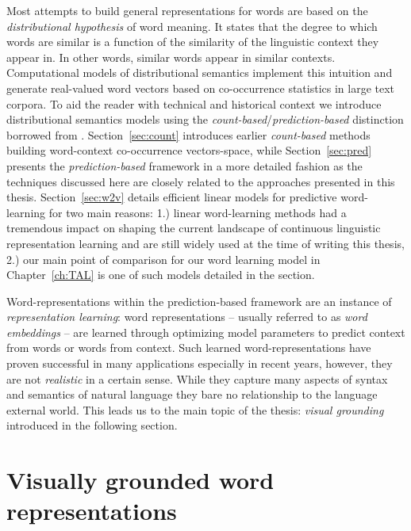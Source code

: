 Most attempts to build  general representations for words are based on the
\emph{distributional hypothesis} of word meaning. It states that the degree to which words are similar
is a function of the similarity of the linguistic context they appear in. In other words, similar
words appear in similar contexts. Computational models of distributional
semantics implement this intuition and generate real-valued word vectors based on co-occurrence
statistics in large text corpora. 
To aid the reader with technical and historical context we introduce distributional
semantics models using the \emph{count-based}/\emph{prediction-based} distinction
borrowed from \cite{baroni2014don}.
Section~\ref{sec:count} introduces earlier \emph{count-based}
methods building word-context co-occurrence vectors-space, while
Section~\ref{sec:pred} presents the  \emph{prediction-based} framework in a more
detailed fashion as the techniques discussed here are closely related
to the approaches presented in this thesis.
Section~\ref{sec:w2v} details efficient linear
models for predictive word-learning for two main reasons: 1.) linear word-learning methods
had a tremendous impact
on shaping the current landscape of continuous linguistic representation learning and are still
widely used at the time of writing this thesis, 2.) our main point of comparison for
our word learning model in Chapter~\ref{ch:TAL} is one of such models detailed in the section.

Word-representations within the prediction-based framework 
are an instance of \emph{representation learning}:
word representations -- usually referred to as \emph{word embeddings} -- are learned through
optimizing model parameters to predict context from words or words from context.
Such learned word-representations have proven successful in many applications especially
in recent years, however, they are not \emph{realistic} in a certain sense. While they capture many
aspects of syntax and semantics of natural language they bare no relationship to the language external world.
This leads us to the main topic of the thesis:  \emph{visual grounding} introduced in the
following section.

\section{Visually grounded word representations}


